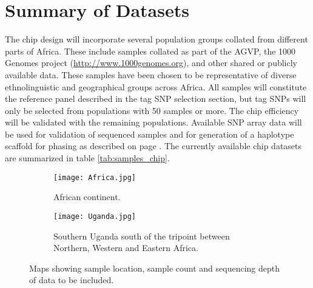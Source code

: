 \section{Summary of Datasets}
The chip design will incorporate several population groups collated from different parts of Africa. These include samples collated as part of the AGVP\cite{Gurdasani2015}, the 1000 Genomes project (\href{http://www.1000genomes.org}{http://www.1000genomes.org}),
 and other shared or publicly available data. These samples have been chosen to be representative of diverse ethnolinguistic and geographical groups across Africa. All samples will constitute the reference panel described in the tag SNP selection section, but tag SNPs will only be selected from populations with 50 samples or more. The chip efficiency will be validated with the remaining populations. Available SNP array data will be used for validation of sequenced samples and for generation of a haplotype scaffold for phasing as described on page \pageref{sec:refine_and_phase}. The currently available chip datasets are summarized in table \ref{tab:samples_chip}.
 
\begin{figure}[h]
\begin{subfigure}{.5\textwidth}
  \centering
  \texttt{[image: Africa.jpg]}
  \caption{African continent.}
\end{subfigure}%
\begin{subfigure}{.5\textwidth}
  \centering
  \texttt{[image: Uganda.jpg]}
  \caption{Southern Uganda south of the tripoint between Northern, Western and Eastern Africa.}
\end{subfigure}%
\caption{Maps showing sample location, sample count and sequencing depth of data to be included.}
\end{figure}



